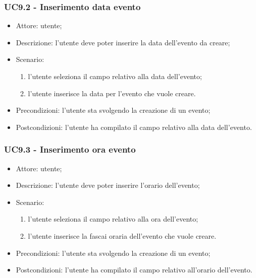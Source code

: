 \subsubsection{UC9.2 - Inserimento data evento}
\begin{itemize}
    \item Attore: utente;
    \item Descrizione: l'utente deve poter inserire la data dell'evento da creare;
    \item Scenario:
        \begin{enumerate}
        \item l'utente seleziona il campo relativo alla data dell'evento;
        \item l'utente inserisce la data per l'evento che vuole creare.
        \end{enumerate}
    
    \item Precondizioni: l'utente sta svolgendo la creazione di un evento;
    \item Postcondizioni: l'utente ha compilato il campo relativo alla data dell'evento.
\end{itemize}


\subsubsection{UC9.3 - Inserimento ora evento}
\begin{itemize}
    \item Attore: utente;
    \item Descrizione: l'utente deve poter inserire l'orario dell'evento;
    \item Scenario:
        \begin{enumerate}
        \item l'utente seleziona il campo relativo alla ora dell'evento;
        \item l'utente inserisce la fascai oraria dell'evento che vuole creare.
        \end{enumerate}
    
    \item Precondizioni: l'utente sta svolgendo la creazione di un evento;
    \item Postcondizioni: l'utente ha compilato il campo relativo all'orario dell'evento.
\end{itemize}

